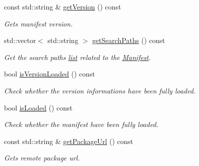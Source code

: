 \begin{DoxyCompactItemize}
\mbox{\label{classManifest_a20a7e73daf1b4b430804ec249adb9423}} 
const std\+::string \& \hyperlink{classManifest_a20a7e73daf1b4b430804ec249adb9423}{get\+Version} () const
\begin{DoxyCompactList}\small\item\em Gets manifest version. \end{DoxyCompactList}\item 
\mbox{\label{classManifest_a779542cc77147b31551e32d1012cd07a}} 
std\+::vector$<$ std\+::string $>$ \hyperlink{classManifest_a779542cc77147b31551e32d1012cd07a}{get\+Search\+Paths} () const
\begin{DoxyCompactList}\small\item\em Get the search paths \hyperlink{protocollist-p}{list} related to the \hyperlink{classManifest}{Manifest}. \end{DoxyCompactList}\item 
\mbox{\label{classManifest_ac60866081038f8f1ca9fdaf22be2005f}} 
bool \hyperlink{classManifest_ac60866081038f8f1ca9fdaf22be2005f}{is\+Version\+Loaded} () const
\begin{DoxyCompactList}\small\item\em Check whether the version informations have been fully loaded. \end{DoxyCompactList}\item 
\mbox{\label{classManifest_a8823e53da0e74218358be708268e0f6d}} 
bool \hyperlink{classManifest_a8823e53da0e74218358be708268e0f6d}{is\+Loaded} () const
\begin{DoxyCompactList}\small\item\em Check whether the manifest have been fully loaded. \end{DoxyCompactList}\item 
\mbox{\label{classManifest_a9cce53ad9eaf77c595e5941609e48846}} 
const std\+::string \& \hyperlink{classManifest_a9cce53ad9eaf77c595e5941609e48846}{get\+Package\+Url} () const
\begin{DoxyCompactList}\small\item\em Gets remote package url. \end{DoxyCompactList}\item 
\mbox{\label{classManifest_a8af57959320ef283a9a56677aa22313e}} 

\end{DoxyCompactItemize}
